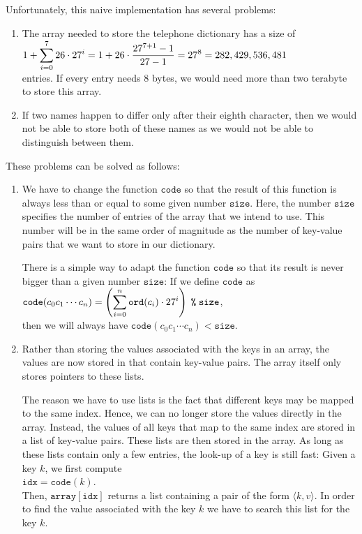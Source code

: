 \noindent
Unfortunately, this naive implementation has several problems: 
\begin{enumerate}
\item The array needed to store the telephone dictionary has a size of 
      \\[0.2cm]
      \hspace*{1.3cm}
      $\displaystyle 1 + \sum\limits_{i=0}^7 26 \cdot 27^i = 1 + 26 \cdot \frac{27^{7+1} - 1}{27 - 1} = 27^8 = 282,429,536,481$ 
      \\[0.2cm]
      entries.  If every entry needs 8 bytes, we would need more than two terabyte to store this array.
\item If two names happen to differ only after their eighth character, then we would not be able to
      store both of these names as we would not be able to distinguish between them.
\end{enumerate}
These problems can be solved as follows:
\begin{enumerate}
\item We have to change the function  $\texttt{code}$ so that the result of this function is always
      less than or equal to some given number $\texttt{size}$.  Here, the number $\texttt{size}$ specifies
      the number of entries of the array that we intend to use.  This number will be in the same
      order of magnitude as the number of key-value pairs that we want to store in our dictionary.

      There is a simple way to adapt the function  $\texttt{code}$ so that its result is never bigger
      than a given number $\texttt{size}$: If we define $\texttt{code}$ as
      \\[0.2cm]
      \hspace*{1.3cm} 
      $\displaystyle\texttt{code}(c_0c_1\cdots c_n) = \left(\sum\limits_{i=0}^n \texttt{ord}(c_i) \cdot
        27^i\right) \;\texttt{\%}\; \texttt{size}$,
      \\[0.2cm]
      then we will always have $\texttt{code}(c_0c_1\cdots c_n) < \texttt{size}$.  
\item Rather than storing the values associated with the keys in an array, the values are now stored
      in  that contain key-value pairs.  The array itself only stores pointers to these
       lists. 
      
      The reason we have to use lists is the fact that different keys may be mapped to the
      same index.  Hence, we can no longer store the values directly in the array.  Instead,
      the values of all keys that map to the same index are stored in a
      list of key-value pairs.  These  lists are then stored in the array.  As long as
      these lists contain only a few entries, the look-up of a key is still fast: Given a key $k$,
      we first compute 
      \\[0.2cm]
      \hspace*{1.3cm}
      $\texttt{idx} = \texttt{code}(k)$.
      \\[0.2cm]
      Then, $\texttt{array}[\texttt{idx}]$ returns a list containing a pair of the form $\langle k, v \rangle$.
      In order to find the value associated with the key $k$ we have to search this list for the key
      $k$.
\end{enumerate}


